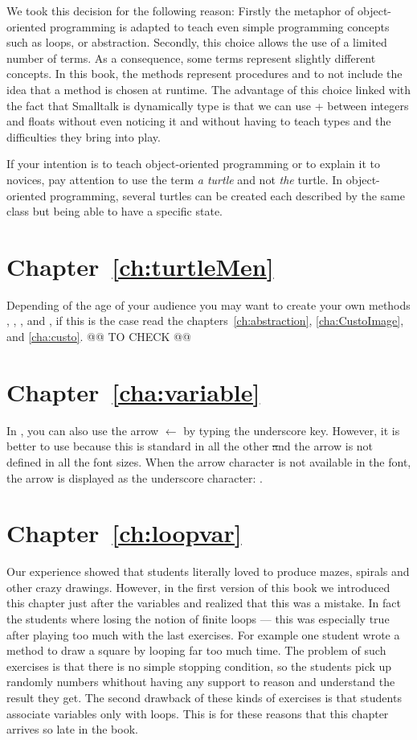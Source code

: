  We took this decision for the following reason: Firstly the metaphor of object-oriented programming is adapted to teach even simple programming concepts such as loops, or  abstraction. Secondly,  this choice allows the use of a limited number of terms. 
 As a consequence, some terms represent slightly different concepts. In this book, the methods represent procedures and to not include the idea that a method is chosen at runtime.  The advantage of this choice linked with the fact that Smalltalk is dynamically type is that we can use + between integers and floats without even noticing it and without having to teach types and the difficulties they bring into play. 

If your intention is to teach object-oriented programming or to
explain it to novices, pay attention to use the term \emph{a turtle} and not 
\emph{the} turtle. In object-oriented programming, several turtles can be created each described by the same class but being able to have a specific state.


\section*{Chapter~\ref{ch:turtleMen}}

Depending of the age of your audience you may want to create your own  methods , ,  ,  and  , if this is the case read the chapters~\ref{ch:abstraction}, \ref{cha:CustoImage}, and \ref{cha:custo}. @@ TO CHECK @@



\section*{Chapter~\ref{cha:variable}}
In \sq, you can also use the arrow $\leftarrow$ by typing the underscore \ct{\_} key. However, it is better to use \ct{:=} because this is standard in all the other \st and the arrow is not defined in all the font sizes. When the arrow character is not available in the font, the arrow is displayed as the underscore character: \ct{\_}.



\section*{Chapter~\ref{ch:loopvar}}

Our experience showed that students literally loved to produce mazes, spirals and other crazy drawings. However, in the first version of this book we introduced this chapter just after the variables and realized that this was a mistake. In fact the students where losing the notion of finite loops --- this was especially true after playing too much with the last exercises.
For example one student wrote a method to draw a square by looping far too much time. The problem of such exercises is that there is no simple stopping condition, so the students pick up randomly numbers whithout having any support to reason and understand the result they get. The second drawback of these kinds of exercises is that students associate variables only with loops. This is for these reasons that this chapter arrives so late in the book.


